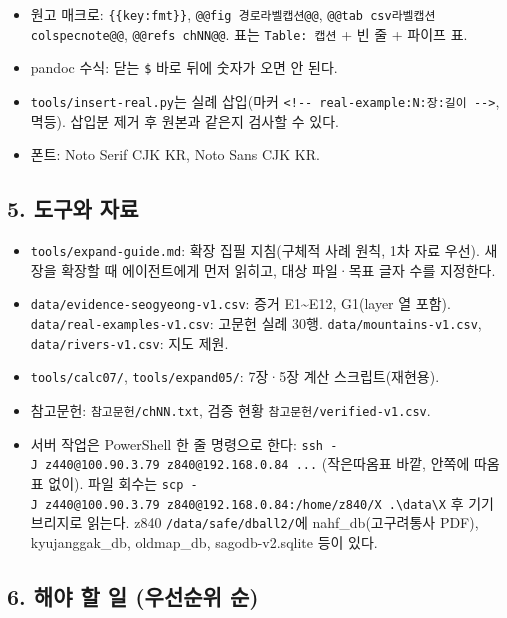 \documentclass[10pt,a4paper]{article}
\providecommand{\tightlist}{\setlength{\itemsep}{0pt}\setlength{\parskip}{0pt}}
\begin{document}
\begin{itemize}
\tightlist
\item
  원고 매크로: \texttt{\{\{key:fmt\}\}}, \texttt{@@fig\ 경로\textbar{}라벨\textbar{}캡션@@}, \texttt{@@tab\ csv\textbar{}라벨\textbar{}캡션\textbar{}colspec\textbar{}note@@}, \texttt{@@refs\ chNN@@}. 표는 \texttt{Table:\ 캡션} + 빈 줄 + 파이프 표.
\item
  pandoc 수식: 닫는 \texttt{\$} 바로 뒤에 숫자가 오면 안 된다.
\item
  \texttt{tools/insert-real.py}는 실례 삽입(마커 \texttt{\textless{}!-\/-\ real-example:N:장:길이\ -\/-\textgreater{}}, 멱등). 삽입분 제거 후 원본과 같은지 검사할 수 있다.
\item
  폰트: Noto Serif CJK KR, Noto Sans CJK KR.
\end{itemize}

\hypertarget{uxb3c4uxad6cuxc640-uxc790uxb8cc}{%
\subsection{5. 도구와 자료}\label{uxb3c4uxad6cuxc640-uxc790uxb8cc}}

\begin{itemize}
\tightlist
\item
  \texttt{tools/expand-guide.md}: 확장 집필 지침(구체적 사례 원칙, 1차 자료 우선). 새 장을 확장할 때 에이전트에게 먼저 읽히고, 대상 파일·목표 글자 수를 지정한다.
\item
  \texttt{data/evidence-seogyeong-v1.csv}: 증거 E1\textasciitilde E12, G1(layer 열 포함). \texttt{data/real-examples-v1.csv}: 고문헌 실례 30행. \texttt{data/mountains-v1.csv}, \texttt{data/rivers-v1.csv}: 지도 제원.
\item
  \texttt{tools/calc07/}, \texttt{tools/expand05/}: 7장·5장 계산 스크립트(재현용).
\item
  참고문헌: \texttt{참고문헌/chNN.txt}, 검증 현황 \texttt{참고문헌/verified-v1.csv}.
\item
  서버 작업은 PowerShell 한 줄 명령으로 한다: \texttt{ssh\ -J\ z440@100.90.3.79\ z840@192.168.0.84\ \textquotesingle{}...\textquotesingle{}} (작은따옴표 바깥, 안쪽에 따옴표 없이). 파일 회수는 \texttt{scp\ -J\ z440@100.90.3.79\ z840@192.168.0.84:/home/z840/X\ .\textbackslash{}data\textbackslash{}X} 후 기기 브리지로 읽는다. z840 \texttt{/data/safe/dball2/}에 nahf\_db(고구려통사 PDF), kyujanggak\_db, oldmap\_db, sagodb-v2.sqlite 등이 있다.
\end{itemize}

\hypertarget{uxd574uxc57c-uxd560-uxc77c-uxc6b0uxc120uxc21cuxc704-uxc21c}{%
\subsection{6. 해야 할 일 (우선순위 순)}\label{uxd574uxc57c-uxd560-uxc77c-uxc6b0uxc120uxc21cuxc704-uxc21c}}
\end{document}
